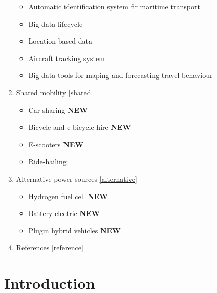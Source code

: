 \documentclass[
]{book}
\providecommand{\tightlist}{%
  \setlength{\itemsep}{0pt}\setlength{\parskip}{0pt}}
\begin{document}
\begin{enumerate}
  \begin{itemize}
  \tightlist
  \item
    Automatic identification system fir maritime transport
  \item
    Big data lifecycle
  \item
    Location-based data
  \item
    Aircraft tracking system
  \item
    Big data tools for maping and forecasting travel behaviour
  \end{itemize}
\item
  Shared mobility \ref{shared}

  \begin{itemize}
  \tightlist
  \item
    Car sharing \textbf{NEW}
  \item
    Bicycle and e-bicycle hire \textbf{NEW}
  \item
    E-scooters \textbf{NEW}
  \item
    Ride-hailing
  \end{itemize}
\item
  Alternative power sources \ref{alternative}

  \begin{itemize}
  \tightlist
  \item
    Hydrogen fuel cell \textbf{NEW}
  \item
    Battery electric \textbf{NEW}
  \item
    Plugin hybrid vehicles \textbf{NEW}
  \end{itemize}
\item
  References \ref{reference}
\end{enumerate}

\hypertarget{intro}{%
\chapter{Introduction}\label{intro}}
\end{document}

